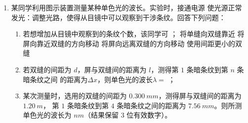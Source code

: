 \begin{enumerate}
\pfourchoices
{}
{}
{}
{}



\item 
{}
某同学利用图示装置测量某种单色光的波长。实验时，接通电源
使光源正常发光：调整光路，使得从目镜中可以观察到干涉条纹。回答下列问题：
\begin{figure}[h!]
	\centering
	
\end{figure}

\begin{enumerate}
	\item
若想增加从目镜中观察到的条纹个数，该同学可 \underlinegap ；
\fourchoices
{将单缝向双缝靠近}
{将屏向靠近双缝的方向移动}
{将屏向远离双缝的方向移动}
{使用间距更小的双缝}


\item 
若双缝的间距为 $ d $，屏与双缝间的距离为 $ l $，测得第 $ 1 $ 条暗条纹到第 $ n $ 条暗条纹之间
的距离为$ \Delta x $，则单色光的波长$ \lambda = $ \underlinegap ；

\item 
某次测量时，选用的双缝的间距为 $ 0.300 \ mm $，测得屏与双缝间的距离为 $ 1.20 \ m $，
第 $ 1 $ 条暗条纹到第 $ 4 $ 条暗条纹之间的距离为 $ 7.56 \ mm $。则所测单色光的波长为 \underlinegap 
$ nm $（结果保留 $ 3 $ 位有效数字）。

\end{enumerate}





\end{enumerate}
